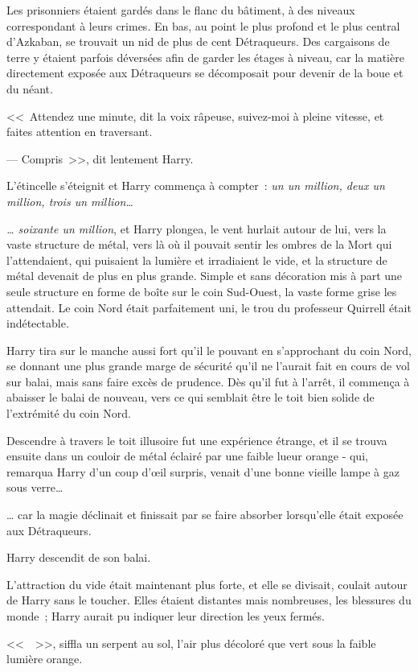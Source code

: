 Les prisonniers étaient gardés dans le flanc du bâtiment, à des niveaux correspondant à leurs crimes. En bas, au point le plus profond et le plus central d'Azkaban, se trouvait un nid de plus de cent Détraqueurs. Des cargaisons de terre y étaient parfois déversées afin de garder les étages à niveau, car la matière directement exposée aux Détraqueurs se décomposait pour devenir de la boue et du néant.

<<~Attendez une minute, dit la voix râpeuse, suivez-moi à pleine vitesse, et faites attention en traversant.

--- Compris~>>, dit lentement Harry.

L'étincelle s'éteignit et Harry commença à compter~: \emph{un un million, deux un million, trois un million…}

\emph{… soixante un million}, et Harry plongea, le vent hurlait autour de lui, vers la vaste structure de métal, vers là où il pouvait sentir les ombres de la Mort qui l'attendaient, qui puisaient la lumière et irradiaient le vide, et la structure de métal devenait de plus en plus grande. Simple et sans décoration mis à part une seule structure en forme de boîte sur le coin Sud-Ouest, la vaste forme grise les attendait. Le coin Nord était parfaitement uni, le trou du professeur Quirrell était indétectable.

Harry tira sur le manche aussi fort qu'il le pouvant en s'approchant du coin Nord, se donnant une plus grande marge de sécurité qu'il ne l'aurait fait en cours de vol sur balai, mais sans faire excès de prudence. Dès qu'il fut à l'arrêt, il commença à abaisser le balai de nouveau, vers ce qui semblait être le toit bien solide de l'extrémité du coin Nord.

Descendre à travers le toit illusoire fut une expérience étrange, et il se trouva ensuite dans un couloir de métal éclairé par une faible lueur orange - qui, remarqua Harry d'un coup d'œil surpris, venait d'une bonne vieille lampe à gaz sous verre…

… car la magie déclinait et finissait par se faire absorber lorsqu'elle était exposée aux Détraqueurs.

Harry descendit de son balai.

L'attraction du vide était maintenant plus forte, et elle se divisait, coulait autour de Harry sans le toucher. Elles étaient distantes mais nombreuses, les blessures du monde~; Harry aurait pu indiquer leur direction les yeux fermés.

<<~~>>, siffla un serpent au sol, l'air plus décoloré que vert sous la faible lumière orange.

